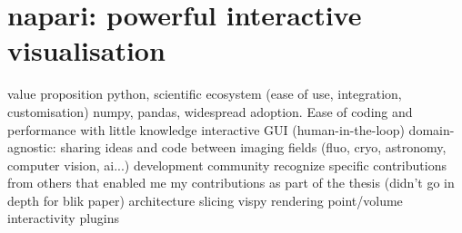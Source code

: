 \chapter{napari: powerful interactive visualisation}

\begin{outline}
\1 value proposition
    \2 python, scientific ecosystem (ease of use, integration, customisation)
    \2 numpy, pandas, widespread adoption. Ease of coding and performance with little knowledge
    \2 interactive GUI (human-in-the-loop)
    \2 domain-agnostic: sharing ideas and code between imaging fields (fluo, cryo, astronomy, computer vision, ai...)
\1 development
    \2 community
        \3 recognize specific contributions from others that enabled me
    \2 my contributions as part of the thesis (didn't go in depth for blik paper)
        \3 architecture
        \3 slicing
        \3 vispy rendering
        \3 point/volume interactivity
        \3 plugins
\end{outline}
